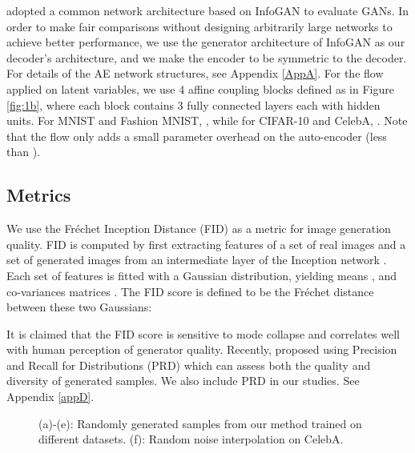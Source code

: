\documentclass{article}
\begin{document}
\citep{AreGan} adopted a common network architecture based on InfoGAN \citep{InfoGAN} to evaluate GANs. In order to make fair comparisons without designing arbitrarily large networks to achieve better performance, we use the generator architecture of InfoGAN as our decoder's architecture, and we make the encoder to be symmetric to the decoder. For details of the AE network structures, see Appendix \ref{AppA}. For the flow applied on latent variables, we use 4 affine coupling blocks defined as in Figure \ref{fig:1b}, where each block contains 3 fully connected layers each with  hidden units. For MNIST and Fashion MNIST, , while for CIFAR-10 and CelebA, . Note that the flow only adds a small parameter overhead on the auto-encoder (less than ).

\subsection{Metrics}
We use the Fr\'echet Inception Distance (FID) \citep{FID} as a metric for image generation quality. FID is computed by first extracting features of a set of real images  and a set of generated images  from an intermediate layer of the Inception network \citep{inception}. Each set of features is fitted with a Gaussian distribution, yielding means ,  and co-variances matrices . The FID score is defined to be the Fréchet distance between these two Gaussians:

It is claimed that the FID score is sensitive to mode collapse and correlates well with human perception of generator quality. Recently, \citep{PRD} proposed using Precision and Recall for Distributions (PRD) which can assess both the quality and diversity of generated samples. We also include PRD in our studies. See Appendix \ref{appD}.

\begin{figure}
    \centering
    \hfill
    \hfill
     \hfill
 
    \hfill
     \hfill
\caption{\label{fig:sample_percept}
    (a)-(e): Randomly generated samples from our method trained on different datasets.
     (f): Random noise interpolation on CelebA.}
\end{figure}
\end{document}
